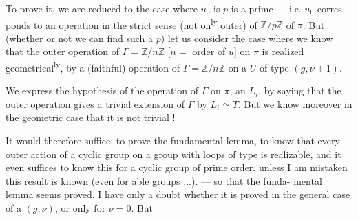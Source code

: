 To prove it, we are reduced  to the
case where $u_0$ is  
$p$ is a prime  --- i.e. $u_0$ corres-
ponds to an operation in the strict sense
(not on\textsuperscript{ly} outer) of $\mathbb Z/p\mathbb Z$  
of $\pi$. But (whether or not we can
find such a $p$) let us consider the case where
we know that the \uline{outer} operation of
$\Gamma=\mathbb Z/n\mathbb Z$ [$n=$ order of $u$] on $\pi$ is realized
geometrical\textsuperscript{ly}, by a (faithful) operation
of $\Gamma=\mathbb Z/n\mathbb Z$ on a $U$ of type $(g,\nu+1)$.



We express the hypothesis of the  operation of $\Gamma$ on
$\pi$,   an $L_i$, by saying that
the outer operation gives a trivial extension
of $\Gamma$ by $L_i\simeq T$. But we know
moreover in the geometric case  that it
is \uline{not} trivial !

It would therefore suffice,  to prove the
fundamental lemma, to know that every
outer action \inserted{[faithful]} of a cyclic group
on a group with loops of type 
is realizable, and it even suffices to know this
for a cyclic group of
prime order.   unless I am mistaken this result
is  known (even for 
able groups ...). --- so that the funda-
mental lemma seems proved. I have only
a doubt whether it is proved in the
general case of a $(g,\nu)$,  or only
for  $\nu=0$. But 

